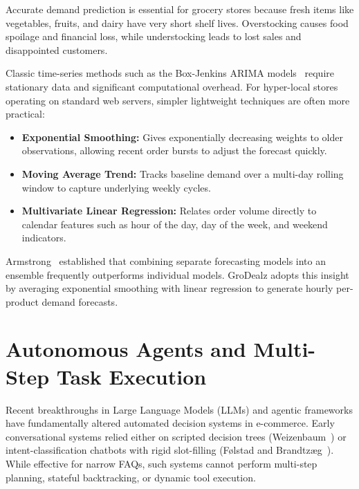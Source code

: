 Accurate demand prediction is essential for grocery stores because fresh items like vegetables, fruits, and dairy have very short shelf lives. Overstocking causes food spoilage and financial loss, while understocking leads to lost sales and disappointed customers.

Classic time-series methods such as the Box-Jenkins ARIMA models~\cite{box2015time} require stationary data and significant computational overhead. For hyper-local stores operating on standard web servers, simpler lightweight techniques are often more practical:
\begin{itemize}
    \item \textbf{Exponential Smoothing:} Gives exponentially decreasing weights to older observations, allowing recent order bursts to adjust the forecast quickly.
    \item \textbf{Moving Average Trend:} Tracks baseline demand over a multi-day rolling window to capture underlying weekly cycles.
    \item \textbf{Multivariate Linear Regression:} Relates order volume directly to calendar features such as hour of the day, day of the week, and weekend indicators.
\end{itemize}
Armstrong~\cite{armstrong2001combining} established that combining separate forecasting models into an ensemble frequently outperforms individual models. GroDealz adopts this insight by averaging exponential smoothing with linear regression to generate hourly per-product demand forecasts.

\section{Autonomous Agents and Multi-Step Task Execution}

Recent breakthroughs in Large Language Models (LLMs) and agentic frameworks have fundamentally altered automated decision systems in e-commerce. Early conversational systems relied either on scripted decision trees (Weizenbaum~\cite{weizenbaum1966eliza}) or intent-classification chatbots with rigid slot-filling (F{\o}lstad and Brandtz{\ae}g~\cite{folstad2017chatbots}). While effective for narrow FAQs, such systems cannot perform multi-step planning, stateful backtracking, or dynamic tool execution.

